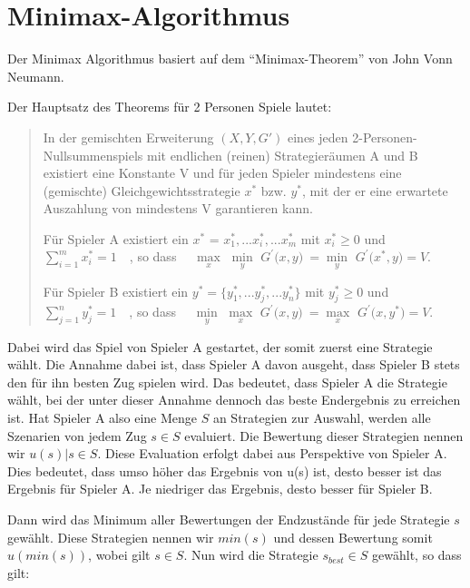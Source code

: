 
\section{Minimax-Algorithmus}\label{minimax}

Der Minimax Algorithmus basiert auf dem ``Minimax-Theorem'' von John Vonn Neumann.

Der Hauptsatz des Theorems für 2 Personen Spiele lautet:

\begin{quote}
In der gemischten Erweiterung $(X, Y, G')$ eines jeden 2-Personen-Nullsummenspiels mit endlichen (reinen) Strategieräumen A und B existiert eine Konstante V und für jeden Spieler mindestens eine (gemischte) Gleichgewichtsstrategie $x^*$ bzw. $y^*$, mit der er eine erwartete Auszahlung von mindestens V garantieren kann.

Für Spieler A existiert ein $x^*$ = ${x^*_1, ... x^*_i, ... x^*_m}$ mit $x^*_i \geq 0$ und $\sum_{i = 1}^m x^*_i= 1\quad $, so dass $\quad \max\limits_x$ $\min\limits_y$ $G^\prime\bigl(x,y\bigr)\ = \min\limits_y$ $G^\prime\bigl(x^*,y\bigr) = V$.

Für Spieler B existiert ein $y^* = \{ y^*_1, ... y^*_j, ... y^*_n\}$ mit $y^*_j\ge 0 $ und $\sum_{j = 1}^n y^*_j= 1\quad$, 
so dass $\quad \min\limits_y$ $\max\limits_x$ $G^\prime\bigl(x,y\bigr)\ = \max\limits_x$ $G^\prime\bigl(x,y^*\bigr) = V$. \cite{Buhlmann1975}
\end{quote}

Dabei wird das Spiel von Spieler A gestartet, der somit zuerst eine Strategie wählt. Die Annahme dabei ist, dass Spieler A davon ausgeht, dass Spieler B stets den für ihn besten Zug spielen wird. Das bedeutet, dass Spieler A die Strategie wählt, bei der unter dieser Annahme dennoch das beste Endergebnis zu erreichen ist. Hat Spieler A also eine Menge $S$ an Strategien zur Auswahl, werden alle Szenarien von jedem Zug $s \in S$ evaluiert. Die Bewertung dieser Strategien nennen wir $u(s) | s \in S$. Diese Evaluation erfolgt dabei aus Perspektive von Spieler A. Dies bedeutet, dass umso höher das Ergebnis von u(s) ist, desto besser ist das Ergebnis für Spieler A. Je niedriger das Ergebnis, desto besser für Spieler B.

Dann wird das Minimum aller Bewertungen der Endzustände für jede Strategie $s$ gewählt. Diese Strategien nennen wir $min(s)$ und dessen Bewertung somit $u(min(s))$, wobei gilt $s \in S$. Nun wird die Strategie $s_{best} \in S$ gewählt, so dass gilt:

